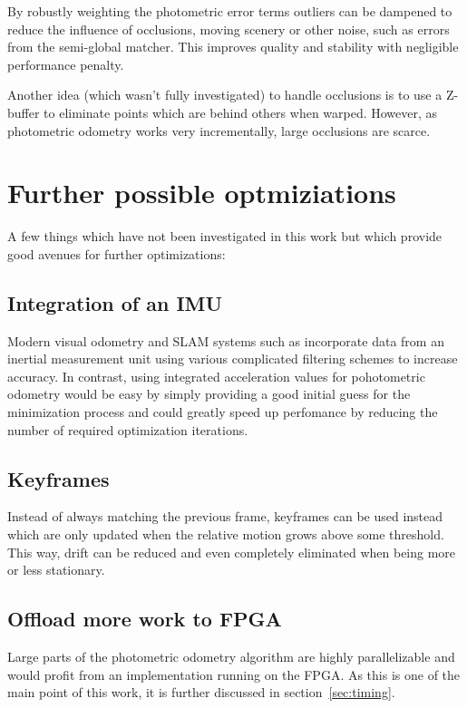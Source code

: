 By robustly weighting the photometric error terms outliers can be dampened to
reduce the influence of occlusions, moving scenery or other noise, such as
errors from the semi-global matcher. This improves quality and stability with
negligible performance penalty.

Another idea (which wasn't fully investigated) to handle occlusions is to use a
Z-buffer to eliminate points which are behind others when warped. However, as
photometric odometry works very incrementally, large occlusions are scarce.

\section{Further possible optmiziations}

A few things which have not been investigated in this work but which provide
good avenues for further optimizations:

\subsection{Integration of an IMU}

Modern visual odometry and SLAM systems such as \cite{leutenegger2013keyframe}
incorporate data from an inertial measurement unit using various complicated
filtering schemes to increase accuracy.
In contrast, using integrated acceleration values for pohotometric odometry
would be easy by simply providing a good initial guess for the minimization
process and could greatly speed up perfomance by reducing the number of
required optimization iterations.

\subsection{Keyframes}

Instead of always matching the previous frame, keyframes can be used instead
which are only updated when the relative motion grows above some threshold.
This way, drift can be reduced and even completely eliminated when being more
or less stationary.

\subsection{Offload more work to FPGA}

Large parts of the photometric odometry algorithm are highly parallelizable and
would profit from an implementation running on the FPGA. As this is one of the
main point of this work, it is further discussed in section~\ref{sec:timing}.



